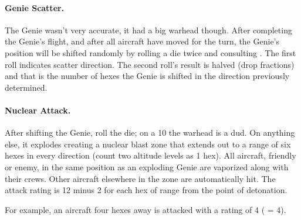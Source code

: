 \begin{advancedrules}
\paragraph{Genie Scatter.} The Genie wasn't very accurate, it had a big warhead though. After completing the Genie's flight, and after all aircraft have moved for the turn, the Genie’s position will be shifted randomly by rolling a die twice and consulting . The first roll indicates scatter direction. The second roll's result is halved (drop fractions) and that is the number of hexes the Genie is shifted in the direction previously determined. 

\paragraph{Nuclear Attack.} After shifting the Genie, roll the die; on a 10 the warhead is a dud. On anything else, it explodes creating a nuclear blast zone that extends out to a range of six hexes in every direction (count two altitude levels as 1 hex). All aircraft, friendly or enemy, in the same position as an exploding Genie are vaporized along with their crews. Other aircraft elsewhere in the zone are automatically hit. The attack rating is 12 minus 2 for each hex of range from the point of detonation.

For example, an aircraft four hexes away is attacked with a rating of 4 ( = 4).

\end{advancedrules}

